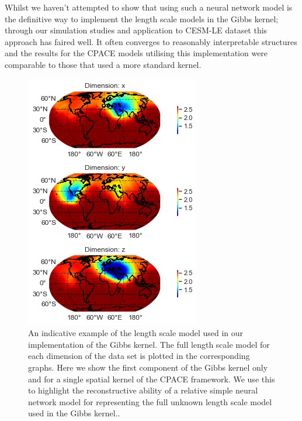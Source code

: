 Whilst we haven't attempted to show that using such a neural network model is the definitive way to implement the length scale models in the Gibbs kernel; through our simulation studies and application to CESM-LE dataset this approach has faired well.
It often converges to reasonably interpretable structures and the results for the CPACE models utilising this implementation were comparable to those that used a more standard kernel.

\begin{figure}
	\centering
	\includegraphics[width=\textwidth]{gibbs_lengthscale}
	\caption{An indicative example of the length scale model used in our implementation of the Gibbs kernel. The full length scale model for each dimension of the data set is plotted in the corresponding graphs. Here we show the first component of the Gibbs kernel only and for a single spatial kernel of the CPACE framework. We use this to highlight the reconstructive ability of a relative simple neural network model for representing the full unknown length scale model used in the Gibbs kernel..}
	\label{fig:gibbs_lengthscale}
\end{figure}